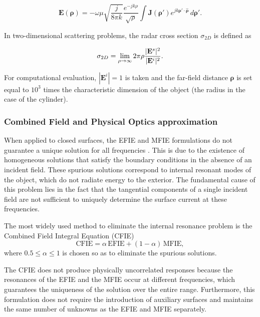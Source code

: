 \documentclass[11pt,a4paper,twoside,pdf]{article}
\numberwithin{equation}{section}
\begin{document}
\begin{equation}
\mathbf{E}(\boldsymbol{\rho})
=
- \omega \mu
\sqrt{\frac{j}{8\pi k}}
\frac{e^{-jk\rho}}{\sqrt{\rho}}
\int
\mathbf{J}(\boldsymbol{\rho}')
e^{jk \boldsymbol{\rho}' \cdot \hat{\boldsymbol{\rho}}}
\, d\boldsymbol{\rho}'.
\label{Elejano}
\end{equation}

In two-dimensional scattering problems, the radar cross section $\sigma_{2D}$ is defined as

\begin{equation}
\sigma_{2D}
= \lim_{\rho \to \infty}
2\pi \rho
\frac{|\mathbf{E}^s|^2}{|\mathbf{E}^i|^2}.
\notag
\end{equation}

For computational evaluation, $|\mathbf{E}^i| = 1$ is taken and the far-field distance $\boldsymbol{\rho}$ is set equal to $10^3$ times the characteristic dimension of the object (the radius in the case of the cylinder).








\subsubsection{Combined Field and Physical Optics approximation}

When applied to closed surfaces, the EFIE and MFIE formulations do not guarantee
a unique solution for all frequencies \cite{gibson2021method}. This is due to the existence of
homogeneous solutions that satisfy the boundary conditions in the absence of an incident field.
These spurious solutions correspond to internal resonant modes of the object,
which do not radiate energy to the exterior. The fundamental
cause of this problem lies in the fact that the tangential components of a single
incident field are not sufficient to uniquely determine the surface
current at these frequencies.


The most widely used method to eliminate the internal resonance problem is the
Combined Field Integral Equation (CFIE)
\begin{equation}
\mathrm{CFIE} = \alpha\, \mathrm{EFIE} + (1-\alpha)\, \mathrm{MFIE},
\end{equation}
where $0.5 \leq \alpha \leq 1$ is chosen so as to eliminate the spurious solutions.

The CFIE does not produce physically uncorrelated responses because the resonances of the EFIE and
the MFIE occur at different frequencies, which guarantees the uniqueness of the solution over the entire range. Furthermore, this formulation does not require the introduction of auxiliary
surfaces and maintains the same number of unknowns as the EFIE and MFIE separately.\\
\end{document}
